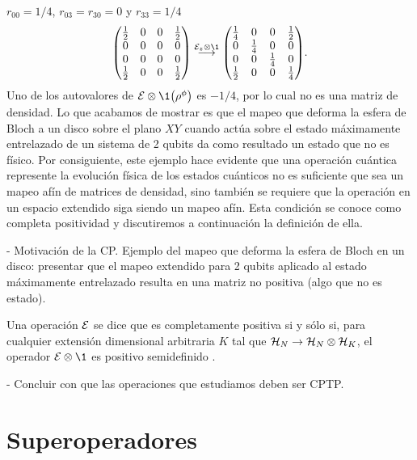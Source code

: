 $r_{00}=1/4$, $r_{03}=r_{30}=0$ y $r_{33}=1/4$
\begin{align}
\mqty( 
\frac{1}{2} & 0 & 0 & \frac{1}{2} \\
0 & 0 & 0 & 0 \\
0 & 0 & 0 & 0 \\
\frac{1}{2} & 0 & 0 & \frac{1}{2} \\
)
\stackrel{\E_{z}\otimes\1}{\longrightarrow}
\mqty( 
\frac{1}{4} & 0 & 0 & \frac{1}{2} \\
0 & \frac{1}{4} & 0 & 0 \\
0 & 0 & \frac{1}{4} & 0 \\
\frac{1}{2} & 0 & 0 & \frac{1}{4} \\
).
\end{align}
Uno de los autovalores de $\E\otimes\1\qty(\rho^{\phi})$ es $-1/4$, por
lo cual no es una matriz de densidad. Lo que acabamos de mostrar es que
el mapeo que deforma la esfera de Bloch a un disco sobre el plano $XY$ 
cuando actúa sobre el estado máximamente entrelazado de un sistema 
de 2 qubits da como resultado un estado que no es físico. Por consiguiente, 
este ejemplo hace evidente que una operación cuántica represente
la evolución física de los estados cuánticos no es suficiente que sea
un mapeo afín de matrices de densidad, sino también se requiere 
que la operación en un espacio extendido siga siendo un mapeo afín. 
Esta condición se conoce como completa positividad y discutiremos
a continuación la definición de ella.   

- Motivación de la CP. Ejemplo del mapeo que deforma la esfera de Bloch
en un disco: presentar que el mapeo extendido para 2 qubits
aplicado al estado máximamente entrelazado resulta en una matriz 
no positiva (algo que no es estado).

Una operación $\mathcal{E}$ se dice que es completamente positiva
si y sólo si, para cualquier extensión dimensional arbitraria $K$ tal que 
$\mathcal{H}_N \rightarrow \mathcal{H}_N \otimes \mathcal{H}_K$,
el operador $\E\otimes\1$ es positivo semidefinido 
\cite{bengtsson_zyczkowski_2017}.

- Concluir con que las operaciones que estudiamos deben ser CPTP.


\section{Superoperadores}

